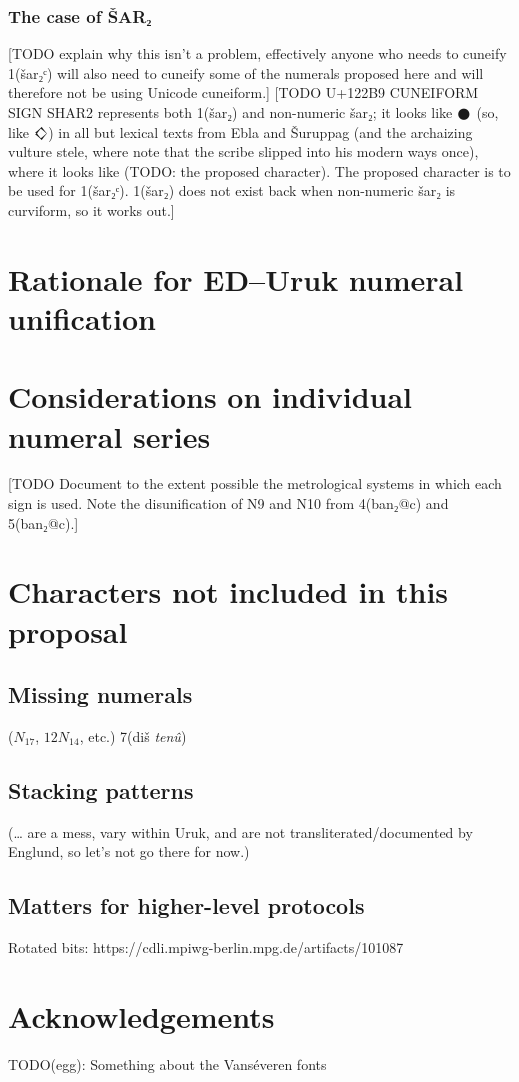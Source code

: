 \documentclass[10pt, a4paper, twoside]{article}
\begin{document}
\subsubsection{The case of ŠAR₂}
[TODO explain why this isn’t a problem, effectively
 anyone who needs to cuneify 1(šar₂ᶜ) will also need
 to cuneify some of the numerals proposed here and
 will therefore not be using Unicode cuneiform.]
[TODO U+122B9 \textsc{CUNEIFORM SIGN SHAR2}
 represents both 1(šar₂) and non-numeric šar₂;
 it looks like {\xsuxfont 𒊹} (so, like {\xsuxfont 𒄭})
 in all but lexical texts from Ebla and Šuruppag (and
 the archaizing vulture stele, where note that the scribe slipped into his modern ways once),
 where it looks like (TODO: the proposed character).
 The proposed character is to be used for 1(šar₂ᶜ).
 1(šar₂) does not exist back when non-numeric šar₂ is curviform, so it works out.]

\section{Rationale for ED–Uruk numeral unification}
\label{unificationRationale}

\section{Considerations on individual numeral series}

[TODO Document to the extent possible the metrological systems in which each sign is used.
Note the disunification of N9 and N10 from 4(ban₂@c) and 5(ban₂@c).]

\section{Characters not included in this proposal}
\subsection{Missing numerals}
($N_{17}$, $12N_{14}$, etc.) 7(diš \emph{tenû})
\subsection{Stacking patterns}
\label{stackingPatterns}
(… are a mess, vary within Uruk, and are not transliterated/documented by Englund, so let’s not go there for now.)
\subsection{Matters for higher-level protocols}
Rotated bits:
https://cdli.mpiwg-berlin.mpg.de/artifacts/101087

\section{Acknowledgements}

TODO(egg): Something about the Vanséveren fonts

\printbibliography
\end{document}
